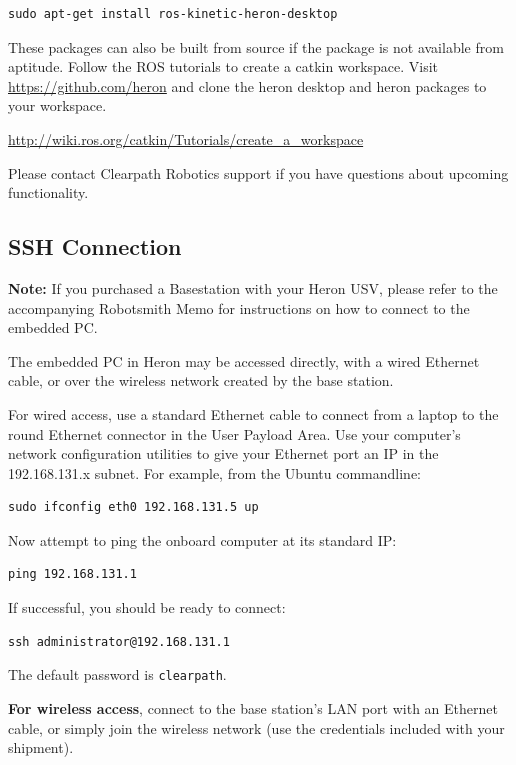 \documentclass[]{clearpath-latex/clearpath-manual}
\begin{document}
\begin{lstlisting} 
sudo apt-get install ros-kinetic-heron-desktop
\end{lstlisting}

These packages can also be built from source if the package is not available from aptitude. Follow the ROS tutorials to create a catkin workspace. Visit \url{https://github.com/heron} and clone the heron desktop and heron packages to your workspace. 

\url{http://wiki.ros.org/catkin/Tutorials/create_a_workspace}

Please contact Clearpath Robotics support if you have questions about upcoming functionality.



\subsection{SSH Connection}

\textbf{Note:} If you purchased a Basestation with your Heron USV, please refer to the accompanying Robotsmith Memo for instructions on how to connect to the embedded PC. 

The embedded PC in Heron may be accessed directly, with a wired Ethernet cable, or over the wireless network created by the base station.

For wired access, use a standard Ethernet cable to connect from a laptop to the round Ethernet connector in the User Payload Area. Use your computer’s network configuration utilities to give your Ethernet port an IP in the 192.168.131.x subnet. For example, from the Ubuntu commandline:

\begin{lstlisting}
sudo ifconfig eth0 192.168.131.5 up
\end{lstlisting}

Now attempt to ping the onboard computer at its standard IP:

\begin{lstlisting}
ping 192.168.131.1
\end{lstlisting}

If successful, you should be ready to connect:

\begin{lstlisting}
ssh administrator@192.168.131.1
\end{lstlisting}

The default password is \lstinline{clearpath}.


\textbf{For wireless access}, connect to the base station’s LAN port with an Ethernet cable, or simply join the wireless network (use the credentials included with your shipment). 
\end{document}
